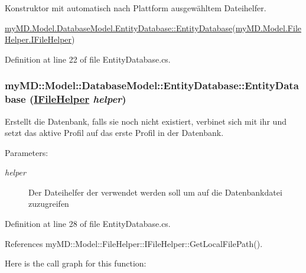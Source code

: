 Konstruktor mit automatisch nach Plattform ausgew\"{a}hltem Dateihelfer. 

\hyperlink{classmy_m_d_1_1_model_1_1_database_model_1_1_entity_database_e7a63762a30ee10ba8c323619eccd584}{my\-MD.Model.Database\-Model.Entity\-Database::Entity\-Database}(\hyperlink{interfacemy_m_d_1_1_model_1_1_file_helper_1_1_i_file_helper}{my\-MD.Model.File\-Helper.IFile\-Helper}) 

Definition at line 22 of file Entity\-Database.cs.\hypertarget{classmy_m_d_1_1_model_1_1_database_model_1_1_entity_database_81426df1f225a7d6a66b94c95a89122d}{
\subsubsection[EntityDatabase]{\setlength{\rightskip}{0pt plus 5cm}my\-MD::Model::Database\-Model::Entity\-Database::Entity\-Database (\hyperlink{interfacemy_m_d_1_1_model_1_1_file_helper_1_1_i_file_helper}{IFile\-Helper} {\em helper})}}
\label{dd/d77/classmy_m_d_1_1_model_1_1_database_model_1_1_entity_database_81426df1f225a7d6a66b94c95a89122d}


Erstellt die Datenbank, falls sie noch nicht existiert, verbinet sich mit ihr und setzt das aktive Profil auf das erste Profil in der Datenbank. 

\begin{Desc}
\item[Parameters:]
\begin{description}
\item[{\em helper}]Der Dateihelfer der verwendet werden soll um auf die Datenbankdatei zuzugreifen\end{description}
\end{Desc}


Definition at line 28 of file Entity\-Database.cs.

References my\-MD::Model::File\-Helper::IFile\-Helper::Get\-Local\-File\-Path().

Here is the call graph for this function:

